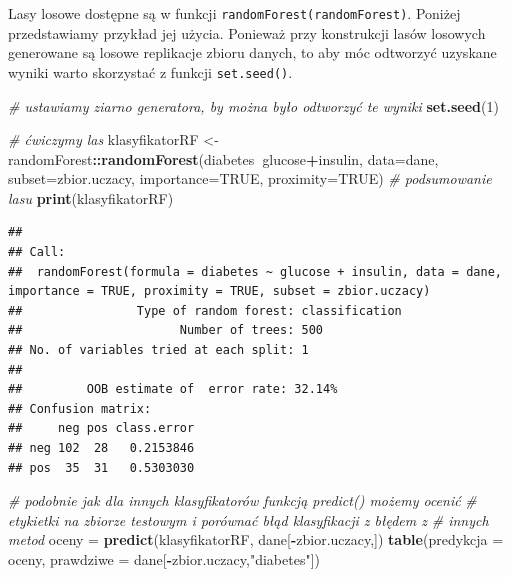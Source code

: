 \documentclass[polish,]{book}
\newenvironment{Shaded}{\begin{snugshade}}{\end{snugshade}}
\newcommand{\CommentTok}[1]{\textcolor[rgb]{0.56,0.35,0.01}{\textit{#1}}}
\newcommand{\DataTypeTok}[1]{\textcolor[rgb]{0.13,0.29,0.53}{#1}}
\newcommand{\DecValTok}[1]{\textcolor[rgb]{0.00,0.00,0.81}{#1}}
\newcommand{\KeywordTok}[1]{\textcolor[rgb]{0.13,0.29,0.53}{\textbf{#1}}}
\newcommand{\NormalTok}[1]{#1}
\newcommand{\OperatorTok}[1]{\textcolor[rgb]{0.81,0.36,0.00}{\textbf{#1}}}
\newcommand{\OtherTok}[1]{\textcolor[rgb]{0.56,0.35,0.01}{#1}}
\newcommand{\StringTok}[1]{\textcolor[rgb]{0.31,0.60,0.02}{#1}}
\begin{document}
Lasy losowe dostępne są w funkcji \texttt{randomForest(randomForest)}. Poniżej przedstawiamy przykład jej użycia. Ponieważ przy konstrukcji lasów losowych generowane
są losowe replikacje zbioru danych, to aby móc odtworzyć uzyskane wyniki warto
skorzystać z funkcji \texttt{set.seed()}.

\begin{Shaded}
\begin{Highlighting}[]
\CommentTok{# ustawiamy ziarno generatora, by można było odtworzyć te wyniki}
\KeywordTok{set.seed}\NormalTok{(}\DecValTok{1}\NormalTok{)}

\CommentTok{# ćwiczymy las}
\NormalTok{klasyfikatorRF <-}\StringTok{ }\NormalTok{randomForest}\OperatorTok{::}\KeywordTok{randomForest}\NormalTok{(diabetes}\OperatorTok{~}\NormalTok{glucose}\OperatorTok{+}\NormalTok{insulin,}
                                             \DataTypeTok{data=}\NormalTok{dane,}
                                             \DataTypeTok{subset=}\NormalTok{zbior.uczacy, }\DataTypeTok{importance=}\OtherTok{TRUE}\NormalTok{, }\DataTypeTok{proximity=}\OtherTok{TRUE}\NormalTok{)}
\CommentTok{# podsumowanie lasu}
\KeywordTok{print}\NormalTok{(klasyfikatorRF)}
\end{Highlighting}
\end{Shaded}

\begin{verbatim}
## 
## Call:
##  randomForest(formula = diabetes ~ glucose + insulin, data = dane,      importance = TRUE, proximity = TRUE, subset = zbior.uczacy) 
##                Type of random forest: classification
##                      Number of trees: 500
## No. of variables tried at each split: 1
## 
##         OOB estimate of  error rate: 32.14%
## Confusion matrix:
##     neg pos class.error
## neg 102  28   0.2153846
## pos  35  31   0.5303030
\end{verbatim}

\begin{Shaded}
\begin{Highlighting}[]
\CommentTok{# podobnie jak dla innych klasyfikatorów funkcją predict() możemy ocenić}
\CommentTok{# etykietki na zbiorze testowym i porównać błąd klasyfikacji z błędem z}
\CommentTok{# innych metod}
\NormalTok{oceny =}\StringTok{ }\KeywordTok{predict}\NormalTok{(klasyfikatorRF, dane[}\OperatorTok{-}\NormalTok{zbior.uczacy,])}
\KeywordTok{table}\NormalTok{(}\DataTypeTok{predykcja =}\NormalTok{ oceny, }\DataTypeTok{prawdziwe =}\NormalTok{ dane[}\OperatorTok{-}\NormalTok{zbior.uczacy,}\StringTok{"diabetes"}\NormalTok{])}
\end{Highlighting}
\end{Shaded}
\end{document}
